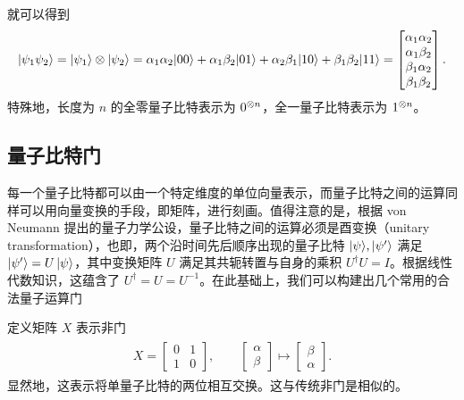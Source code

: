 就可以得到
\begin{align}\begin{aligned}
        |\psi_1\psi_2\rangle=|\psi_1\rangle\otimes|\psi_2\rangle=\alpha_1\alpha_2|00\rangle+\alpha_1\beta_2|01\rangle+\alpha_2\beta_1|10\rangle+\beta_1\beta_2|11\rangle=
        \begin{bmatrix}
            \alpha_1\alpha_2 \\\alpha_1\beta_2\\\beta_1\alpha_2\\\beta_1\beta_2
        \end{bmatrix}.
    \end{aligned}\end{align}
特殊地，长度为 $n$ 的全零量子比特表示为 $0^{\otimes n}$，全一量子比特表示为 $1^{\otimes n}$。

\subsection{量子比特门}

每一个量子比特都可以由一个特定维度的单位向量表示，而量子比特之间的运算同样可以用向量变换的手段，即矩阵，进行刻画。值得注意的是，根据 von Neumann 提出的量子力学公设\cite{von2018mathematical}，量子比特之间的运算必须是酉变换（unitary transformation），也即，两个沿时间先后顺序出现的量子比特 $|\psi\rangle,|\psi'\rangle$ 满足 $|\psi'\rangle=U\,|\psi\rangle$，其中变换矩阵 $U$ 满足其共轭转置与自身的乘积 $U^\dagger U=I$。根据线性代数知识，这蕴含了 $U^\dagger=U=U^{-1}$。在此基础上，我们可以构建出几个常用的合法量子运算门

定义矩阵 $X$ 表示非门 \begin{align}\begin{aligned}
        X=\begin{bmatrix}
              0 & 1 \\
              1 & 0
          \end{bmatrix},\qquad
        \begin{bmatrix}
            \alpha \\\beta
        \end{bmatrix}\mapsto
        \begin{bmatrix}
            \beta \\\alpha
        \end{bmatrix}.
    \end{aligned}\end{align}
显然地，这表示将单量子比特的两位相互交换。这与传统非门是相似的。

